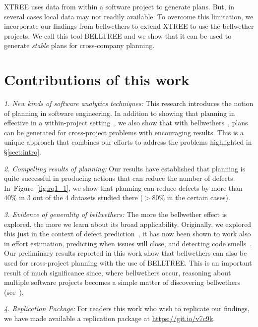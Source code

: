\documentclass[conference]{IEEEtran}
\newcommand{\tion}[1]{\S\ref{sect:#1}}
\newcommand{\fig}[1]{Figure~\ref{fig:#1}}
\theoremstyle{break}
\begin{document}
XTREE uses data from within a software project to generate plans. But, in several cases local data may not readily available. To overcome this limitation, we incorporate our findings from bellwethers to extend XTREE to use the bellwether projects. We call this tool BELLTREE and we show that it can be used to generate \textit{stable} plans for cross-company planning. 

\section{Contributions of this work}
\label{sect:contributions}

\noindent\textit{1. New kinds of software analytics techniques:} This research introduces the notion of planning in software engineering. In addition to showing that planning in effective in a within-project setting~\cite{krishna17a}, we also show that with bellwethers~\cite{krishna16}, plans can be generated for cross-project problems with encouraging results. 
This is a unique approach that combines our efforts to address the problems highlighted in \tion{intro}.  %

\noindent\textit{2. Compelling results of planning:} Our results have established that planning is quite successful in producing actions that can reduce the number of defects. In~\fig{rq1_1}, we show that planning can reduce defects by more than 40\% in 3 out of the 4 datasets studied there ($>$80\% in the certain cases).

\noindent\textit{3. Evidence of generality of bellwethers:}
The more the bellwether effect is explored, the more we learn about its broad applicability. Originally, we explored this just in the context of defect prediction~\cite{krishna16}, it has now been shown to work also in effort estimation, predicting when issues will close, and detecting code smells~\cite{krishna17b}. Our preliminary results reported in this work show that bellwethers can also be used for cross-project planning with the use of BELLTREE. This is an important result of much significance since, where bellwethers occur, reasoning about multiple software projects becomes a simple matter of discovering bellwethers (see~\cite{krishna16}).

\noindent\textit{4. Replication Package:} For readers this work who wish to replicate our findings, we have made available a replication package at \url{https://git.io/v7c9k}. 
\end{document}
